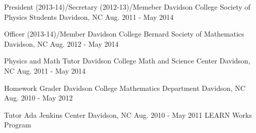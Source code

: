 \begin{cventries}
  \cventry
    {President (2013-14)/Secretary (2012-13)/Memeber} %
    {Davidson College Society of Physics Students} %
    {Davidson, NC} %
    {Aug. 2011 - May 2014} %
    {}
    {}
\end{cventries}
\begin{cventries}
  \cventry
    {Officer (2013-14)/Member} %
    {Davidson College Bernard Society of Mathematics} %
    {Davidson, NC} %
    {Aug. 2012 - May 2014} %
    {}
    {}
\end{cventries}
\begin{cventries}
  \cventry
    {Physics and Math Tutor} %
    {Davidson College Math and Science Center} %
    {Davidson, NC} %
    {Aug. 2011 - May 2014} %
    {}
    {}
\end{cventries}
\begin{cventries}
  \cventry
    {Homework Grader} %
    {Davidson College Mathematics Department} %
    {Davidson, NC} %
    {Aug. 2010 - May 2012} %
    {}
    {}
\end{cventries}
\begin{cventries}
  \cventry
    {Tutor} %
    {Ada Jenkins Center} %
    {Davidson, NC} %
    {Aug. 2010 - May 2011} %
    {}
    {LEARN Works Program}
\end{cventries}
